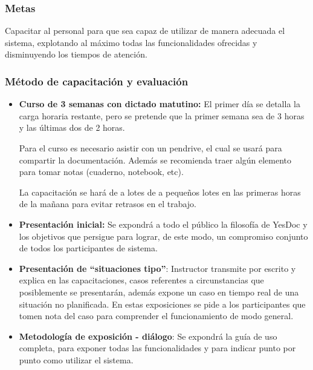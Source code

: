 \documentclass[a4paper,12pt]{article}
\begin{document}
\subsubsection{Metas}
 Capacitar al personal para que sea capaz de utilizar de manera adecuada el sistema, explotando al máximo todas las funcionalidades ofrecidas y disminuyendo los tiempos de atención.
 

\subsubsection{Método de capacitación y evaluación}
    \begin{itemize}
    	\item \textbf{Curso de 3 semanas con dictado matutino: }El primer día se detalla la carga horaria restante, pero se pretende que la primer semana sea de 3 horas y las últimas dos de 2 horas.
        
Para el curso es necesario asistir con un pendrive, el cual se usará para compartir la documentación. Además se recomienda traer algún elemento para tomar notas (cuaderno, notebook, etc).

La capacitación se hará de a lotes de a pequeños lotes en las primeras horas de la mañana para evitar retrasos en el trabajo.
		\item \textbf{Presentación inicial: } Se expondrá a todo el público la filosofía de YesDoc y los objetivos que persigue para lograr, de este modo, un compromiso conjunto de todos los participantes de sistema.
        
	    \item \textbf{Presentación de “situaciones tipo”}: Instructor transmite por escrito y explica en
las capacitaciones, casos referentes a circunstancias que posiblemente se presentarán, además expone un caso en tiempo real de una situación no planificada. En estas exposiciones se pide a los participantes que tomen nota del caso para comprender el funcionamiento de modo general.

	    \item \textbf{Metodología de exposición - diálogo}: Se expondrá la guía de uso completa, para exponer todas las funcionalidades y para indicar punto por punto como utilizar el sistema.
        



\end{itemize}
\end{document}
